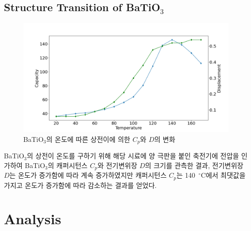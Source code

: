 \documentclass[aps,reprint,superscriptaddress,10pt]{revtex4-2}
\begin{document}
\subsection{Structure Transition of BaTiO$_3$}
\begin{figure}[htb!]
  \centering
  \includegraphics[scale=0.2]{CD.png}
  \caption{BaTiO$_3$의 온도에 따른 상전이에 의한 $C_p$와 $D$의 변화}
  \label{fig:CD}
\end{figure}

BaTiO$_3$의 상전이 온도를 구하기 위해 해당 시료에 양 극판을 붙인 축전기에 전압을 인가하여
BaTiO$_3$의 캐퍼시턴스 $C_p$와 전기변위장 $D$의 크기를 관측한 결과,
전기변위장 $D$는 온도가 증가함에 따라 계속 증가하였지만
캐퍼시턴스 $C_p$는 140~$^\circ$C에서 최댓값을 가지고 온도가 증가함에 따라 감소하는 결과를
얻었다.


\section{Analysis}
\end{document}
